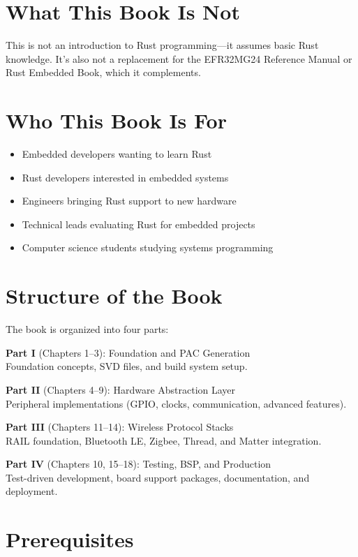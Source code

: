 \documentclass[11pt,a4paper,twoside,openright]{book}
\begin{document}
\section*{What This Book Is Not}

This is not an introduction to Rust programming---it assumes basic Rust knowledge. It's also not a replacement for the EFR32MG24 Reference Manual or Rust Embedded Book, which it complements.

\section*{Who This Book Is For}

\begin{itemize}
    \item Embedded developers wanting to learn Rust
    \item Rust developers interested in embedded systems
    \item Engineers bringing Rust support to new hardware
    \item Technical leads evaluating Rust for embedded projects
    \item Computer science students studying systems programming
\end{itemize}

\section*{Structure of the Book}

The book is organized into four parts:

\textbf{Part I} (Chapters 1--3): Foundation and PAC Generation
\\Foundation concepts, SVD files, and build system setup.

\textbf{Part II} (Chapters 4--9): Hardware Abstraction Layer
\\Peripheral implementations (GPIO, clocks, communication, advanced features).

\textbf{Part III} (Chapters 11--14): Wireless Protocol Stacks
\\RAIL foundation, Bluetooth LE, Zigbee, Thread, and Matter integration.

\textbf{Part IV} (Chapters 10, 15--18): Testing, BSP, and Production
\\Test-driven development, board support packages, documentation, and deployment.

\section*{Prerequisites}
\end{document}
